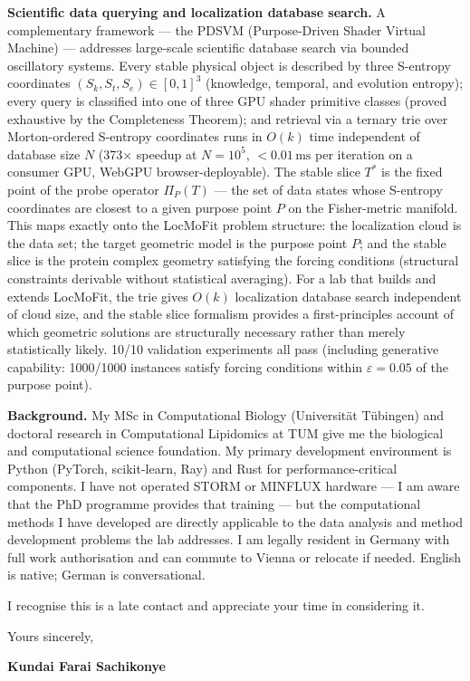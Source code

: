 \documentclass[12pt,a4paper]{article}
\begin{document}
\textbf{Scientific data querying and localization database search.}
A complementary framework --- the PDSVM (Purpose-Driven Shader Virtual Machine)
--- addresses large-scale scientific database search via bounded oscillatory systems.
Every stable physical object is described by three S-entropy coordinates
$(S_k, S_t, S_e) \in [0,1]^3$ (knowledge, temporal, and evolution entropy);
every query is classified into one of three GPU shader primitive classes
(proved exhaustive by the Completeness Theorem);
and retrieval via a ternary trie over Morton-ordered S-entropy coordinates
runs in $O(k)$ time independent of database size $N$ (373$\times$ speedup at
$N=10^5$, $< 0.01\,\mathrm{ms}$ per iteration on a consumer GPU, WebGPU browser-deployable).
The stable slice $T^*$ is the fixed point of the probe operator $\Pi_P(T)$ ---
the set of data states whose S-entropy coordinates are closest to a given purpose
point $P$ on the Fisher-metric manifold.
This maps exactly onto the LocMoFit problem structure:
the localization cloud is the data set; the target geometric model is the purpose
point $P$; and the stable slice is the protein complex geometry satisfying the
forcing conditions (structural constraints derivable without statistical averaging).
For a lab that builds and extends LocMoFit, the trie gives $O(k)$
localization database search independent of cloud size, and the stable slice
formalism provides a first-principles account of which geometric solutions are
structurally necessary rather than merely statistically likely.
10/10 validation experiments all pass (including generative capability:
1000/1000 instances satisfy forcing conditions within $\varepsilon = 0.05$
of the purpose point).

\textbf{Background.}
My MSc in Computational Biology (Universität Tübingen) and doctoral research
in Computational Lipidomics at TUM give me the biological and computational
science foundation. My primary development environment is Python (PyTorch,
scikit-learn, Ray) and Rust for performance-critical components. I have not
operated STORM or MINFLUX hardware --- I am aware that the PhD programme
provides that training --- but the computational methods I have developed
are directly applicable to the data analysis and method development problems
the lab addresses.
I am legally resident in Germany with full work authorisation and can commute
to Vienna or relocate if needed. English is native; German is conversational.

I recognise this is a late contact and appreciate your time in considering it.

\vspace{1.5em}
Yours sincerely,

\vspace{2.5em}
\textbf{Kundai Farai Sachikonye}
\end{document}

